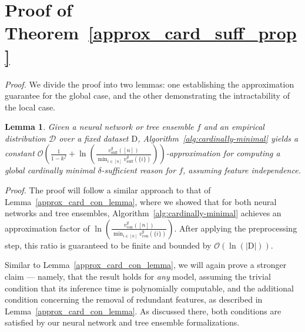 \documentclass{article}
\newtheorem{lemma}{Lemma}
\begin{document}
\section{Proof of Theorem~\ref{approx_card_suff_prop}}
\label{approx_card_suff_prop_sec}

\approxcardsuff*

\emph{Proof.} We divide the proof into two lemmas: one establishing the approximation guarantee for the global case, and the other demonstrating the intractability of the local case.


\begin{lemma}
        Given a neural network or tree ensemble $f$ and an empirical distribution $\mathcal{D}$ over a fixed dataset $\text{D}$, Algorithm~\ref{alg:cardinally-minimal} yields a \emph{constant} $\mathcal{O}\left(\frac{1}{1-k^f}+\ln\left(\frac{v^g_{\text{suff}}([n])}{\min_{i \in [n]} v^g_{\text{suff}}(\{i\})}\right)\right)$-approximation for computing a global cardinally minimal $\delta$-sufficient reason for $f$, assuming feature independence.
\end{lemma}

\emph{Proof.} The proof will follow a similar approach to that of Lemma~\ref{approx_card_con_lemma}, where we showed that for both neural networks and tree ensembles, Algorithm~\ref{alg:cardinally-minimal} achieves an approximation factor of $\ln\left(\frac{v^g_{\text{con}}([n])}{\min_{i \in [n]} v^g_{\text{con}}(\{i\})}\right)$. After applying the preprocessing step, this ratio is guaranteed to be finite and bounded by $\mathcal{O}(\ln(|\text{D}|))$.



Similar to Lemma~\ref{approx_card_con_lemma}, we will again prove a stronger claim --- namely, that the result holds for \emph{any} model, assuming the trivial condition that its inference time is polynomially computable, and the additional condition concerning the removal of redundant features, as described in Lemma~\ref{approx_card_con_lemma}. As discussed there, both conditions are satisfied by our neural network and tree ensemble formalizations.
\end{document}
